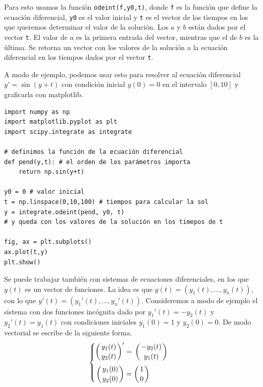 \documentclass[a4paper, 12pt]{report}
\theoremstyle{definition}
\begin{document}
Para esto usamos la función {\tt odeint(f,y0,t)}, donde {\tt f} es la función que define la ecuación diferencial, {\tt y0} es el valor inicial y {\tt t} es el vector de los tiempos en los que queremos determinar el valor de la solución. Los $a$ y $b$ están dados por el vector {\tt t}. El valor de $a$ es la primera entrada del vector, mientras que el de $b$ es la última. Se retorna un vector con los valores de la solución a la ecuación diferencial en los tiempos dados por el vector {\tt t}.

A modo de ejemplo, podemos usar esto para resolver al ecuación diferencial $y' = \sin(y+t)$ con condición inicial $y(0)=0$ en el intervalo $[0,10]$ y graficarla con matplotlib.
\begin{verbatim}
import numpy as np
import matplotlib.pyplot as plt
import scipy.integrate as integrate

# definimos la función de la ecuación diferencial
def pend(y,t): # el orden de los parámetros importa
    return np.sin(y+t)

y0 = 0 # valor inicial
t = np.linspace(0,10,100) # tiempos para calcular la sol
y = integrate.odeint(pend, y0, t)
# y queda con los valores de la solución en los timepos de t

fig, ax = plt.subplots()
ax.plot(t,y)
plt.show()
\end{verbatim}

Se puede trabajar también con sistemas de ecuaciones diferenciales, en los que $y(t)$ es un vector de funciones. La idea es que $y(t) = (y_1(t),\dots, y_n(t))$, con lo que $y'(t)=(y_1'(t),\dots, y_n'(t))$. Consideremos a modo de ejemplo el sistema con dos funciones incógnita dado por $y_1'(t) = -y_2(t)$ y $y_2'(t) = y_1(t)$ con condiciones iniciales $y_1(0)=1$ y $y_2(0)=0$. De modo vectorial se escribe de la siguiente forma.
$$\begin{cases}
\begin{aligned}
	\left({\displaystyle y_1(t)\atop\displaystyle y_2(t)}\right)' &=\, \left({\displaystyle -y_2(t)\atop\displaystyle y_1(t)}\right)\\[1ex]
	\left({\displaystyle y_1(0)\atop\displaystyle y_2(0)}\right) &= \left({\displaystyle 1\atop\displaystyle 0}\right)
\end{aligned}	 
\end{cases}
$$
\end{document}
